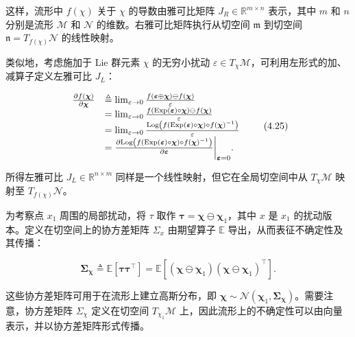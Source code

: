 这样，流形中 $f(\chi)$ 关于 $\chi$ 的导数由雅可比矩阵 $J_R \in \mathbb{R}^{m \times n}$ 表示，其中 $m$ 和 $n$ 分别是流形 $\mathcal{M}$ 和 $\mathcal{N}$ 的维数。右雅可比矩阵执行从切空间 $\mathfrak{m}$ 到切空间 $\mathfrak{n} = T_{f(\chi)}\mathcal{N}$ 的线性映射。

类似地，考虑施加于 Lie 群元素 $\chi$ 的无穷小扰动 $\varepsilon \in T_{\chi}\mathcal{M}$，可利用左形式的加、减算子定义左雅可比 $J_L$：

\begin{equation}
\begin{array}{r l} \frac {\partial f (\boldsymbol {\chi})}{\partial \boldsymbol {\chi}} & \triangleq \lim _ {\varepsilon \to 0} \frac {f (\boldsymbol {\varepsilon} \oplus \boldsymbol {\chi}) \ominus f (\boldsymbol {\chi})}{\varepsilon} \\ & = \lim _ {\varepsilon \to 0} \frac {f (\mathrm{Exp} (\boldsymbol {\varepsilon}) \circ \boldsymbol {\chi}) \ominus f (\boldsymbol {\chi})}{\varepsilon} \\ & = \lim _ {\varepsilon \to 0} \frac {\mathrm{Log} \left(f (\mathrm{Exp} (\boldsymbol {\varepsilon}) \circ \boldsymbol {\chi}) \circ f (\boldsymbol {\chi}) ^ {- 1}\right)}{\varepsilon} \\ & = \frac {\partial \mathrm{Log} \left(f (\mathrm{Exp} (\boldsymbol {\varepsilon}) \circ \boldsymbol {\chi}) \circ f (\boldsymbol {\chi}) ^ {- 1}\right)}{\partial \boldsymbol {\varepsilon}} \bigg | _ {\boldsymbol {\varepsilon} = 0}. \end{array}\tag{4.25}
\end{equation}

所得左雅可比 $J_L \in \mathbb{R}^{n \times m}$ 同样是一个线性映射，但它在全局切空间中从 $T_{\chi}\mathcal{M}$ 映射至 $T_{f(\chi)}\mathcal{N}$。

为考察点 $x _ { 1 }$ 周围的局部扰动，将 $\tau$ 取作 $\pmb { \tau } = \pmb { \chi } \ominus \pmb { \chi } _ { 1 }$，其中 $x$ 是 $x _ { 1 }$ 的扰动版本。定义在切空间上的协方差矩阵 $\Sigma _ { x }$ 由期望算子 $\mathbb { E }$ 导出，从而表征不确定性及其传播：

\begin{equation}
\boldsymbol {\Sigma} _ {\boldsymbol {\chi}} \triangleq \mathbb {E} [ \boldsymbol {\tau} \boldsymbol {\tau} ^ {\top} ] = \mathbb {E} [ (\boldsymbol {\chi} \ominus \boldsymbol {\chi} _ {1}) (\boldsymbol {\chi} \ominus \boldsymbol {\chi} _ {1}) ^ {\top} ].\tag{4.26}
\end{equation}

这些协方差矩阵可用于在流形上建立高斯分布，即 $\pmb{\chi} \sim \mathcal{N}(\pmb{\chi}_1, \pmb{\Sigma}_{\pmb{\chi}})$。需要注意，协方差矩阵 $\Sigma_{\chi}$ 定义在切空间 $T_{\chi_1}\mathcal{M}$ 上，因此流形上的不确定性可以由向量表示，并以协方差矩阵形式传播。

